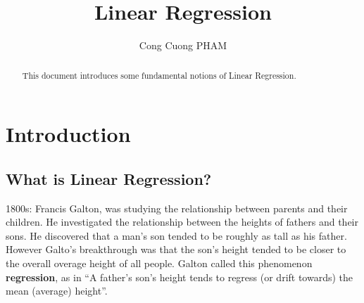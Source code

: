 \documentclass{article}
\begin{document}
\title{Linear Regression}
\author{Cong Cuong PHAM}

\maketitle

\begin{abstract}
This document introduces some fundamental notions of Linear Regression.
\end{abstract}

\section{Introduction}
\subsection{What is Linear Regression?}
\par 1800s: Francis Galton, was studying the relationship between parents and their children. He investigated the relationship between the heights of fathers and their sons. He discovered that a man's son tended to be roughly as tall as his father. However Galto's breakthrough was that the son's height tended to be closer to the overall overage height of all people. Galton called this phenomenon {\bf{regression}}, as in ``A father's son's height tends to regress (or drift towards) the mean (average) height''.
\end{document}
